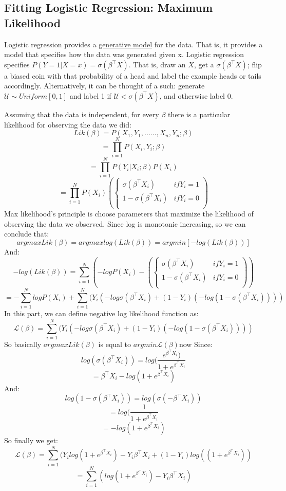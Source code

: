 \documentclass[a4paper]{article}
\begin{document}
\subsection{Fitting Logistic Regression: Maximum Likelihood}
Logistic regression provides a \underline{generative model} for the data. That is, it provides a model that specifies how the data was generated given x. Logistic regression specifies $P(Y=1 | X =x) = \sigma(\beta^\top X)$. That is, draw an $X$, get a $\sigma(\beta^\top X)$; flip a biased coin with that probability of a head and label the example heads or tails accordingly. Alternatively, it can be thought of a such: generate $\mathcal{U} \sim Uniform[0,1]$ and label 1  if $\mathcal{U} < \sigma(\beta^\top X)$, and otherwise label 0. \newline

Assuming that the data is independent, for every $\beta$ there is a particular likelihood for observing the data we did:\newline
$$Lik(\beta)=P(X_1,Y_1,......,X_n,Y_n;\beta)$$
$$=\prod_{i=1}^N P(X_i,Y_i;\beta)$$
$$ =\prod_{i=1}^N P(Y_i|X_i;\beta)P(X_i)$$
$$ =\prod_{i=1}^N P(X_i)(
\begin{cases} 
      \sigma(\beta^\top X_i) & if  Y_i=1 \\
      1-\sigma(\beta^\top X_i) & if  Y_i=0 \\
\end{cases})
$$
Max likelihood's principle is choose parameters that maximize the likelihood of observing the data we observed.\newline
Since log is monotonic increasing, so we can conclude that:\newline
$$argmax Lik(\beta)=argmax log(Lik(\beta))=argmin[-log(Lik(\beta))]$$\newline
And:
$$-log(Lik(\beta))=\sum_{i=1}^N (-logP(X_i)-(\begin{cases} 
      \sigma(\beta^\top X_i) & if  Y_i=1 \\
      1-\sigma(\beta^\top X_i) & if  Y_i=0 \\
\end{cases}))$$
$$=-\sum_{i=1}^NlogP(X_i)+\sum_{i=1}^N(Y_i(-log\sigma(\beta^\top X_i)+
(1-Y_i)(-log(1-\sigma(\beta^\top X_i))))$$
In this part, we can define negative log likelihood function as:\newline
$$\mathcal{L}(\beta)=\sum_{i=1}^N(Y_i(-log\sigma(\beta^\top X_i)+
(1-Y_i)(-log(1-\sigma(\beta^\top X_i))))$$\newline
So basically $argmax Lik(\beta)$ is equal to $argmin \mathcal{L}(\beta)$now\newline
Since:\newline
$$log(\sigma(\beta^\top X_i))=log(\frac{e^{\beta^\top X_i})}{1+e^{\beta^\top X_i}}$$
$$=\beta^\top X_i-log(1+e^{\beta^\top X_i})$$\newline
And:\newline
$$log(1-\sigma(\beta^\top X_i))=log(\sigma(-\beta^\top X_i))$$
$$=log(\frac{1}{1+e^{\beta^\top X_i}}$$
$$=-log(1+e^{\beta^\top X_i})$$
So finally we get:\newline
$$\mathcal{L}(\beta)=\sum_{i=1}^N(Y_i log(1+e^{\beta^\top X_i})-Y_i\beta^\top X_i+(1-Y_i)log((1+e^{\beta^\top X_i}))$$
$$=\sum_{i=1}^N(log(1+e^{\beta^\top X_i})-Y_i\beta^\top X_i)$$
\end{document}
